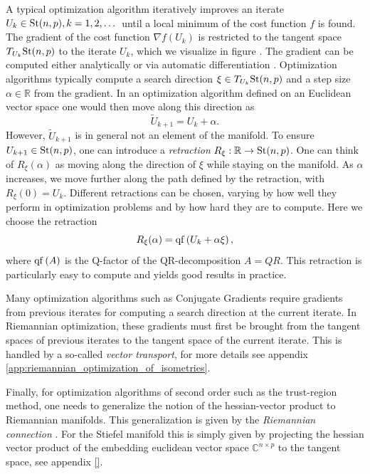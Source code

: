 A typical optimization algorithm iteratively improves an iterate $U_k\in\text{St}(n,p), k=1,2,\dots$ until a local minimum of the cost function $f$ is found. The gradient of the cost function $\nabla f\left(U_k\right)$ is restricted to the tangent space $T_{U_k}\text{St}(n,p)$ to the iterate $U_k$, which we visualize in figure . The gradient can be computed either analytically or via automatic differentiation \cite{cite:riemannian_geometry_automatic_differentiation_quantum_physics, cite:pymanopt}. Optimization algorithms typically compute a search direction $\xi\in T_{U_k}\text{St}(n,p)$ and a step size $\alpha \in \mathbb{R}$ from the gradient. In an optimization algorithm defined on an Euclidean vector space one would then move along this direction as
\begin{equation}
	\tilde{U}_{k+1} = U_k + \alpha.
\end{equation}
However, $\tilde{U}_{k+1}$ is in general not an element of the manifold. To ensure $U_{k+1}\in\text{St}(n,p)$, one can introduce a \textit{retraction} $R_\xi:\mathbb{R}\to\text{St}(n,p)$. One can think of $R_\xi\left(\alpha\right)$ as moving along the direction of $\xi$ while staying on the manifold. As $\alpha$ increases, we move further along the path defined by the retraction, with $R_\xi(0) = U_k$. Different retractions can be chosen, varying by how well they perform in optimization problems and by how hard they are to compute. Here we choose the retraction
\begin{equation}
	R_\xi(\alpha) = \operatorname{qf}\left(U_k + \alpha\xi\right),
\end{equation}
where $\operatorname{qf}\left(A\right)$ is the Q-factor of the QR-decomposition $A = QR$. This retraction is particularly easy to compute and yields good results in practice. \par
Many optimization algorithms such as Conjugate Gradients require gradients from previous iterates for computing a search direction at the current iterate. In Riemannian optimization, these gradients must first be brought from the tangent spaces of previous iterates to the tangent space of the current iterate. This is handled by a so-called \textit{vector transport}, for more details see appendix \ref{app:riemannian_optimization_of_isometries}. \par
Finally, for optimization algorithms of second order such as the trust-region method, one needs to generalize the notion of the hessian-vector product to Riemannian manifolds. This generalization is given by the \textit{Riemannian connection} \cite{cite:optimization_on_matrix_manifolds}. For the Stiefel manifold this is simply given by projecting the hessian vector product of the embedding euclidean vector space $\mathbb{C}^{n\times p}$ to the tangent space, see appendix \ref{}. \par
